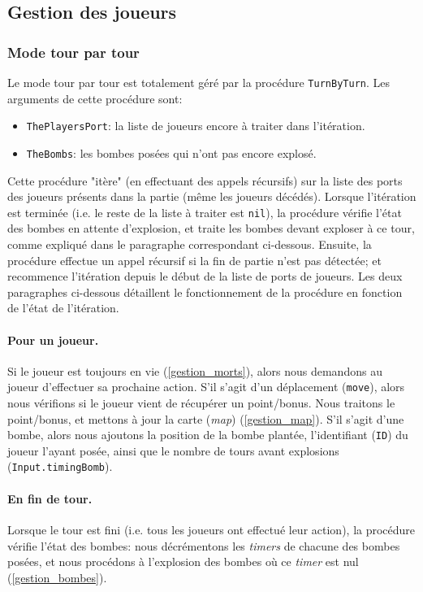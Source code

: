 \documentclass{article}
\begin{document}
\subsection{Gestion des joueurs}
\subsubsection{Mode tour par tour}
Le mode tour par tour est totalement géré par la procédure \texttt{TurnByTurn}. Les arguments de cette procédure sont:
\begin{itemize}
	\item \texttt{ThePlayersPort}: la liste de joueurs encore à traiter dans l'itération.
	\item \texttt{TheBombs}: les bombes posées qui n'ont pas encore explosé.
\end{itemize}
 Cette procédure "itère" (en effectuant des appels récursifs) sur la liste des ports des joueurs présents dans la partie (même les joueurs décédés). Lorsque l'itération est terminée (i.e. le reste de la liste à traiter est \texttt{nil}), la procédure vérifie l'état des bombes en attente d'explosion, et traite les bombes devant exploser à ce tour, comme expliqué dans le paragraphe correspondant ci-dessous. Ensuite, la procédure effectue un appel récursif si la fin de partie n'est pas détectée; et recommence l'itération depuis le début de la liste de ports de joueurs. Les deux paragraphes ci-dessous détaillent le fonctionnement de la procédure en fonction de l'état de l'itération.

\paragraph{Pour un joueur.}Si le joueur est toujours en vie (\ref{gestion_morts}), alors nous demandons au joueur d'effectuer sa prochaine action. S'il s'agit d'un déplacement (\texttt{move}), alors nous vérifions si le joueur vient de récupérer un point/bonus. Nous traitons le point/bonus, et mettons à jour la carte (\emph{map}) (\ref{gestion_map}). S'il s'agit d'une bombe, alors nous ajoutons la position de la bombe plantée, l'identifiant (\texttt{ID}) du joueur l'ayant posée, ainsi que le nombre de tours avant explosions (\texttt{Input.timingBomb}).

\paragraph{En fin de tour.}Lorsque le tour est fini (i.e. tous les joueurs ont effectué leur action), la procédure vérifie l'état des bombes: nous décrémentons les \emph{timers} de chacune des bombes posées, et nous procédons à l'explosion des bombes où ce \emph{timer} est nul (\ref{gestion_bombes}).
\end{document}
